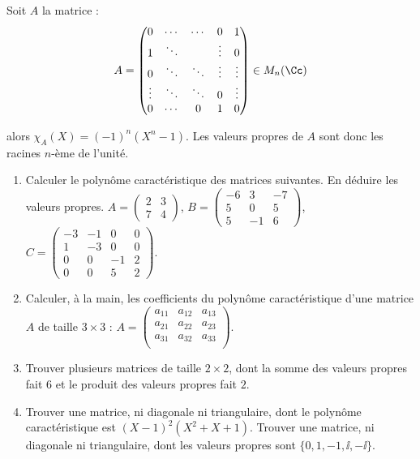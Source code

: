 \documentclass[11pt, class=report,crop=false]{standalone}
\begin{document}
\begin{exemple}
Soit $A$ la matrice :
$$A = 
\begin{pmatrix}
0&\cdots&\cdots&0&1\\
1&\ddots&&\vdots&0\\
0&\ddots&\ddots&\vdots&\vdots\\
\vdots&\ddots&\ddots&0&\vdots\\
0&\cdots&0&1&0
\end{pmatrix}
\in M_n(\Cc)
$$

alors $\chi_A(X) = (-1)^n(X^n-1)$.
Les valeurs propres de $A$ sont donc les racines $n$-ème de l'unité.
\end{exemple}




\begin{miniexercices}
\sauteligne
\begin{enumerate}
  \item Calculer le polynôme caractéristique des matrices suivantes. En déduire les valeurs propres. 
  $A = \left(\begin{smallmatrix}2 & 3 \\7 & 4 \end{smallmatrix}\right)$,
  $B = \left(\begin{smallmatrix}-6 & 3 & -7 \\5 & 0 & 5 \\5 & -1 & 6 \end{smallmatrix}\right)$,   
  $C = \left(\begin{smallmatrix}-3 & -1 & 0 & 0 \\1 & -3 & 0 & 0 \\0 & 0 & -1 & 2 \\0 & 0 & 5 & 2 \end{smallmatrix}\right)$. 
   
  \item Calculer, à la main, les coefficients du polynôme caractéristique d'une matrice $A$ de taille
  $3\times3$ :
  $A = \left(\begin{smallmatrix}a_{11}&a_{12}&a_{13}\\a_{21}&a_{22}&a_{23}\\a_{31}&a_{32}&a_{33}\\ \end{smallmatrix}\right)$. 
  
  \item Trouver plusieurs matrices de taille $2\times2$, dont la somme des valeurs propres fait $6$ et le produit des valeurs propres fait $2$.
  
  \item Trouver une matrice, ni diagonale ni triangulaire, dont le polynôme caractéristique est 
  $(X-1)^2(X^2+X+1)$. 
  Trouver une matrice, ni diagonale ni triangulaire, dont les valeurs propres sont 
  $\{0,1,-1,\ii,-\ii\}$.

\end{enumerate}
\end{miniexercices}
\end{document}
